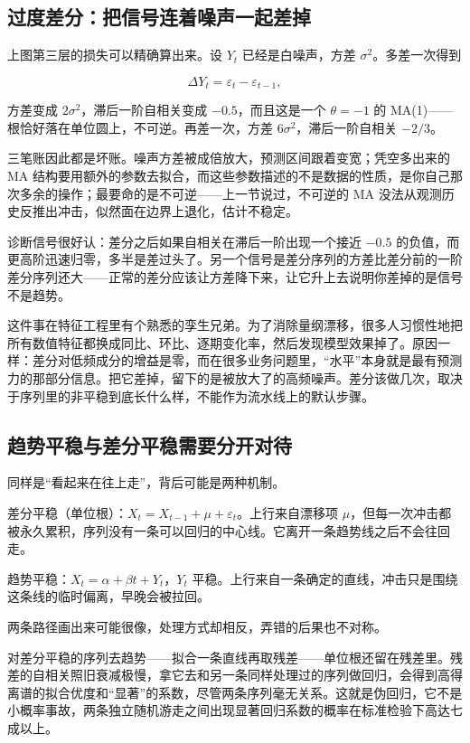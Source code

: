 \subsection{过度差分：把信号连着噪声一起差掉}

上图第三层的损失可以精确算出来。设 \(Y_t\) 已经是白噪声，方差 \(\sigma^2\)。多差一次得到

\[
\Delta Y_t=\varepsilon_t-\varepsilon_{t-1},
\]

方差变成 \(2\sigma^2\)，滞后一阶自相关变成 \(-0.5\)，而且这是一个 \(\theta=-1\) 的 MA(1)——根恰好落在单位圆上，不可逆。再差一次，方差 \(6\sigma^2\)，滞后一阶自相关 \(-2/3\)。

三笔账因此都是坏账。噪声方差被成倍放大，预测区间跟着变宽；凭空多出来的 MA 结构要用额外的参数去拟合，而这些参数描述的不是数据的性质，是你自己那次多余的操作；最要命的是不可逆——上一节说过，不可逆的 MA 没法从观测历史反推出冲击，似然面在边界上退化，估计不稳定。

诊断信号很好认：差分之后如果自相关在滞后一阶出现一个接近 \(-0.5\) 的负值，而更高阶迅速归零，多半是差过头了。另一个信号是差分序列的方差比差分前的一阶差分序列还大——正常的差分应该让方差降下来，让它升上去说明你差掉的是信号不是趋势。

这件事在特征工程里有个熟悉的孪生兄弟。为了消除量纲漂移，很多人习惯性地把所有数值特征都换成同比、环比、逐期变化率，然后发现模型效果掉了。原因一样：差分对低频成分的增益是零，而在很多业务问题里，``水平''本身就是最有预测力的那部分信息。把它差掉，留下的是被放大了的高频噪声。差分该做几次，取决于序列里的非平稳到底长什么样，不能作为流水线上的默认步骤。

\subsection{趋势平稳与差分平稳需要分开对待}

同样是``看起来在往上走''，背后可能是两种机制。

差分平稳（单位根）：\(X_t=X_{t-1}+\mu+\varepsilon_t\)。上行来自漂移项 \(\mu\)，但每一次冲击都被永久累积，序列没有一条可以回归的中心线。它离开一条趋势线之后不会往回走。

趋势平稳：\(X_t=\alpha+\beta t+Y_t\)，\(Y_t\) 平稳。上行来自一条确定的直线，冲击只是围绕这条线的临时偏离，早晚会被拉回。

两条路径画出来可能很像，处理方式却相反，弄错的后果也不对称。

对差分平稳的序列去趋势——拟合一条直线再取残差——单位根还留在残差里。残差的自相关照旧衰减极慢，拿它去和另一条同样处理过的序列做回归，会得到高得离谱的拟合优度和``显著''的系数，尽管两条序列毫无关系。这就是伪回归，它不是小概率事故，两条独立随机游走之间出现显著回归系数的概率在标准检验下高达七成以上。

